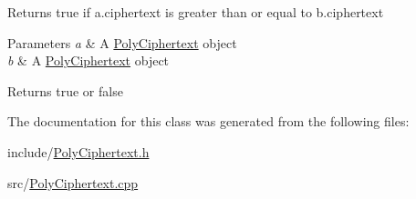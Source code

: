 Returns true if {\ttfamily a.\+ciphertext} is greater than or equal to {\ttfamily b.\+ciphertext} 
\begin{DoxyParams}{Parameters}
{\em a} & A {\ttfamily \hyperlink{classPolyCiphertext}{Poly\+Ciphertext}} object \\
\hline
{\em b} & A {\ttfamily \hyperlink{classPolyCiphertext}{Poly\+Ciphertext}} object \\
\hline
\end{DoxyParams}
\begin{DoxyReturn}{Returns}
{\ttfamily true} or {\ttfamily false} 
\end{DoxyReturn}


The documentation for this class was generated from the following files\+:\begin{DoxyCompactItemize}
\item 
include/\hyperlink{PolyCiphertext_8h}{Poly\+Ciphertext.\+h}\item 
src/\hyperlink{PolyCiphertext_8cpp}{Poly\+Ciphertext.\+cpp}\end{DoxyCompactItemize}
